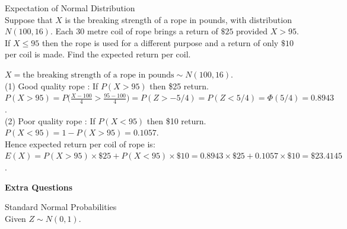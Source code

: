 \documentclass[bigtut]{tutorial}\usepackage[]{graphicx}\usepackage[]{color}
\makeatletter
\newcommand{\hlnum}[1]{\textcolor[rgb]{0.686,0.059,0.569}{#1}}%
\newcommand{\hlcom}[1]{\textcolor[rgb]{0.678,0.584,0.686}{\textit{#1}}}%
\newcommand{\hlopt}[1]{\textcolor[rgb]{0,0,0}{#1}}%
\newcommand{\hlstd}[1]{\textcolor[rgb]{0.345,0.345,0.345}{#1}}%
\newcommand{\hlkwd}[1]{\textcolor[rgb]{0.737,0.353,0.396}{\textbf{#1}}}%
\newenvironment{kframe}{%
 \def\at@end@of@kframe{}%
 \ifinner\ifhmode%
  \def\at@end@of@kframe{\end{minipage}}%
  \begin{minipage}{\columnwidth}%
 \fi\fi%
 \def\FrameCommand##1{\hskip\@totalleftmargin \hskip-\fboxsep
 \colorbox{shadecolor}{##1}\hskip-\fboxsep
     \hskip-\linewidth \hskip-\@totalleftmargin \hskip\columnwidth}%
 \MakeFramed {\advance\hsize-\width
   \@totalleftmargin\z@ \linewidth\hsize
   \@setminipage}}%
 {\par\unskip\endMakeFramed%
 \at@end@of@kframe}
\newenvironment{knitrout}{}{} %
\makeatother
\begin{document}
\begin{tutorial}
\begin{questions}
\begin{solution}
\end{solution}




\question Expectation of Normal Distribution \\

Suppose that $X$ is the breaking strength of a rope in pounds, with distribution $N(100,16)$. Each 30 metre coil of rope brings a return of $\$25$ provided $X > 95$. If $X\leq 95$ then the rope is used for a different purpose and a return of only $ \$10 $ per coil is made. Find the expected return per coil. 



\begin{solution}
$X = \text{the breaking strength of a rope in pounds} \sim N(100,16)$.  \\

(1) Good quality rope : If $P(X> 95)$ then \$25 return. \\

$P(X > 95) = P \big( \frac{X-100}{4} > \frac{95-100}{4} \big) = P(Z > -5/4) = P(Z < 5/4) = \Phi(5/4) = 0.8943$. \\

(2) Poor quality rope : If $P(X< 95)$ then \$10 return. \\

$P(X < 95) = 1- P(X > 95) = 0.1057$. \\

Hence expected return per coil of rope is: \\
$E(X) = P(X>95) \times \$25 + P(X<95) \times \$10 = 
0.8943 \times \$25 + 0.1057 \times \$10 = \$23.4145 $.
\end{solution}





\newpage
\hspace{-1cm}  {\bf Extra Questions}


\question Standard Normal Probabilities  \\

Given $Z \sim N (0,1)$. \\

\end{questions}
\end{tutorial}
\end{document}
